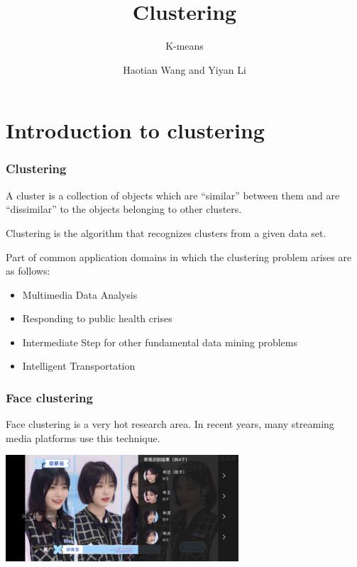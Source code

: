 \documentclass[9pt]{beamer}
\begin{document}

\title{Clustering}
\subtitle{K-means}
\author{Haotian Wang and Yiyan Li}
\date{\hspace{2em}}
\frame{
	\titlepage
}
\section{Introduction to clustering}
\begin{frame}
	\frametitle{Clustering}
	\begin{definition}
		A cluster is a collection of objects which are “similar” between them and are “dissimilar” to the objects belonging to other clusters.
	\end{definition}
	\begin{definition}
		Clustering is the algorithm that recognizes clusters from a given data set.
	\end{definition}
	\pause
	Part of common application domains in which the clustering problem arises are as follows:
	\begin{itemize}
		\item Multimedia Data Analysis
		\item Responding to public health crises
		\item Intermediate Step for other fundamental data mining problems
		\item Intelligent Transportation
	\end{itemize}
\end{frame}

\begin{frame}
		\frametitle{Face clustering}
Face clustering is a very hot research area. In recent years, many streaming media platforms use this technique.\par
	\centerline{\includegraphics[width=0.65\textwidth]{figures/aiqiyi.png}}
\end{frame}
\end{document}
